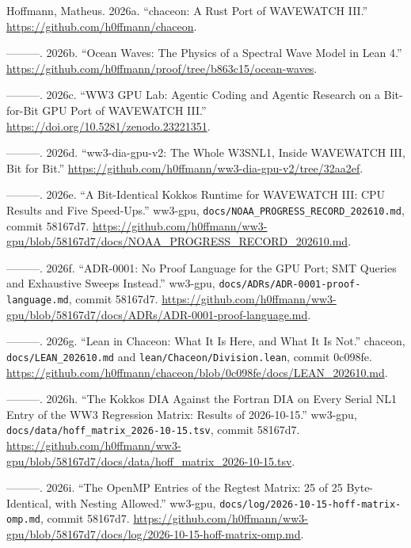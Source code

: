 \documentclass[10pt,a4paper,]{article}
\newlength{\cslhangindent}
\newenvironment{CSLReferences}[2] %
 {\small\begin{list}{}{%
  \setlength{\itemindent}{0pt}
  \setlength{\leftmargin}{0pt}
  \setlength{\parsep}{0pt}
  \ifodd #1
   \setlength{\leftmargin}{\cslhangindent}
   \setlength{\itemindent}{-1\cslhangindent}
  \fi
  \setlength{\itemsep}{#2\baselineskip}}}
 {\end{list}}
\begin{document}
\protect{}\label{refs}
\begin{CSLReferences}{1}{0}
Hoffmann, Matheus. 2026a. {``{chaceon}: A {Rust} Port of {WAVEWATCH
III}.''} \url{https://github.com/h0ffmann/chaceon}.

---------. 2026b. {``Ocean Waves: The Physics of a Spectral Wave Model
in {Lean} 4.''}
\url{https://github.com/h0ffmann/proof/tree/b863c15/ocean-waves}.

---------. 2026c. {``{WW3 GPU Lab}: Agentic Coding and Agentic Research
on a Bit-for-Bit {GPU} Port of {WAVEWATCH III}.''}
\url{https://doi.org/10.5281/zenodo.23221351}.

---------. 2026d. {``{ww3-dia-gpu-v2}: The Whole {W3SNL1}, Inside
{WAVEWATCH III}, Bit for Bit.''}
\url{https://github.com/h0ffmann/ww3-dia-gpu-v2/tree/32aa2ef}.

---------. 2026e. {``A Bit-Identical {Kokkos} Runtime for {WAVEWATCH
III}: {CPU} Results and Five Speed-Ups.''} ww3-gpu,
\texttt{docs/NOAA\_PROGRESS\_RECORD\_202610.md}, commit 58167d7.
\url{https://github.com/h0ffmann/ww3-gpu/blob/58167d7/docs/NOAA_PROGRESS_RECORD_202610.md}.

---------. 2026f. {``{ADR-0001}: No Proof Language for the {GPU} Port;
{SMT} Queries and Exhaustive Sweeps Instead.''} ww3-gpu,
\texttt{docs/ADRs/ADR-0001-proof-language.md}, commit 58167d7.
\url{https://github.com/h0ffmann/ww3-gpu/blob/58167d7/docs/ADRs/ADR-0001-proof-language.md}.

---------. 2026g. {``Lean in Chaceon: What It Is Here, and What It Is
Not.''} chaceon, \texttt{docs/LEAN\_202610.md} and
\texttt{lean/Chaceon/Division.lean}, commit 0c098fe.
\url{https://github.com/h0ffmann/chaceon/blob/0c098fe/docs/LEAN_202610.md}.

---------. 2026h. {``The {Kokkos} {DIA} Against the {Fortran} {DIA} on
Every Serial {NL1} Entry of the {WW3} Regression Matrix: Results of
2026-10-15.''} ww3-gpu, \texttt{docs/data/hoff\_matrix\_2026-10-15.tsv},
commit 58167d7.
\url{https://github.com/h0ffmann/ww3-gpu/blob/58167d7/docs/data/hoff_matrix_2026-10-15.tsv}.

---------. 2026i. {``The {OpenMP} Entries of the Regtest Matrix: 25 of
25 Byte-Identical, with Nesting Allowed.''} ww3-gpu,
\texttt{docs/log/2026-10-15-hoff-matrix-omp.md}, commit 58167d7.
\url{https://github.com/h0ffmann/ww3-gpu/blob/58167d7/docs/log/2026-10-15-hoff-matrix-omp.md}.


\end{CSLReferences}
\end{document}
